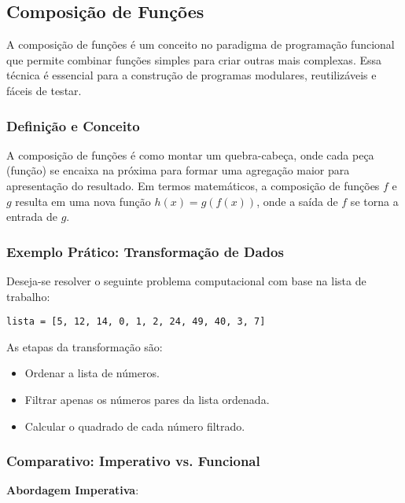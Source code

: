 \subsection{Composição de Funções}
A composição de funções é um conceito no paradigma de programação funcional que permite combinar funções simples para criar outras mais complexas. Essa técnica é essencial para a construção de programas modulares, reutilizáveis e fáceis de testar.

\subsubsection{Definição e Conceito}
A composição de funções é como montar um quebra-cabeça, onde cada peça (função) se encaixa na próxima para formar uma agregação maior para apresentação do resultado. Em termos matemáticos, a composição de funções $f$ e $g$ resulta em uma nova função $h(x) = g(f(x))$, onde a saída de $f$ se torna a entrada de $g$.

\subsubsection{Exemplo Prático: Transformação de Dados}
Deseja-se resolver o seguinte problema computacional com base na lista de trabalho:
\begin{verbatim}
lista = [5, 12, 14, 0, 1, 2, 24, 49, 40, 3, 7]
\end{verbatim}
As etapas da transformação são:
\begin{itemize}
    \item Ordenar a lista de números.
    \item Filtrar apenas os números pares da lista ordenada.
    \item Calcular o quadrado de cada número filtrado.
\end{itemize}

\subsubsection{Comparativo: Imperativo vs. Funcional}

\textbf{Abordagem Imperativa}:

